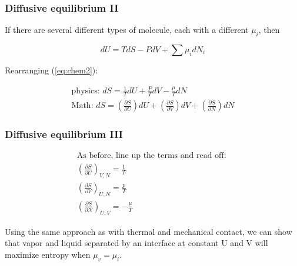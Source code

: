 \documentclass[hyperref={colorlinks=true,linkcolor=blue,urlcolor=blue},numbers]{beamer}
\begin{document}
\begin{frame}
  \frametitle{Diffusive equilibrium II}

If there are several
different types of molecule, each with a different  $\mu_i$, then

\begin{equation}
\label{eq:chem2}
  dU = T dS - PdV + \sum \mu_i dN_i
\end{equation}


Rearranging (\ref{eq:chem2}):

\begin{gather}
\text{physics: } dS = \frac{1 }{T} dU + \frac{ P}{T} dV - \frac{ \mu}{T} dN\\
  \text{Math: } dS = \left ( \frac{\partial S }{\partial U} \right ) dU +
\left ( \frac{\partial S }{\partial V} \right ) dV +
\left ( \frac{\partial S }{\partial N} \right ) dN
\end{gather}
\end{frame}

\begin{frame}
  \frametitle{Diffusive equilibrium III}

  \begin{subequations}
  \begin{gather}
\text{As before, line up the terms and read off: } \nonumber\\
 \left ( \frac{\partial S }{\partial U}   \right )_{V,N} = \frac{ 1}{T} \\
 \left (  \frac{ \partial S}{ \partial V}  \right )_{U,N} = \frac{p }{T} \\
 \left (  \frac{ \partial S}{ \partial N}  \right )_{U,V} = -\frac{\mu }{T}
\label{eq:diff3}
\end{gather}
  \end{subequations}

Using the same approach as with thermal and mechanical contact, we can show
that vapor and liquid separated by an interface at constant U and V will
maximize entropy when $\mu_v = \mu_l$.

\end{frame}
\end{document}
